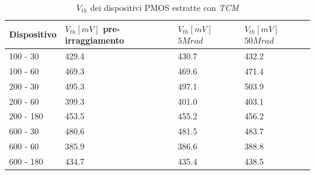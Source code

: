 \documentclass[12pt, letterpaper]{book}
\begin{document}
\begin{table}[htp]
  \renewcommand{\arraystretch}{1.3}
  \caption{$V_{th}$ dei dispositivi PMOS estratte con \emph{TCM}}
  \label{tab:VthTCM}
  \begin{center}
    \begin{tabular}{m{2.5 cm} m{2.5 cm} m{2.5 cm} m{2.5 cm} }
      \toprule
      Dispositivo & $V_{th} [mV]$  pre-irraggiamento & $V_{th} [mV]$ $5Mrad$ & $V_{th} [mV]$ $50Mrad$ \\
      \midrule
      100 - 30    & 429.4                            & 430.7                 & 432.2                  \\
      \hline
      100 - 60    & 469.3                            & 469.6                 & 471.4                  \\
      \hline
      200 - 30    & 495.3                            & 497.1                 & 503.9                  \\
      \hline
      200 - 60    & 399.3                            & 401.0                 & 403.1                  \\
      \hline
      200 - 180   & 453.5                            & 455.2                 & 456.2                  \\
      \hline
      600 - 30    & 480.6                            & 481.5                 & 483.7                  \\
      \hline
      600 - 60    & 385.9                            & 386.6                 & 388.8                  \\
      \hline
      600 - 180   & 434.7                            & 435.4                 & 438.5                  \\
      \bottomrule
    \end{tabular}



\end{center}
\end{table}
\end{document}
